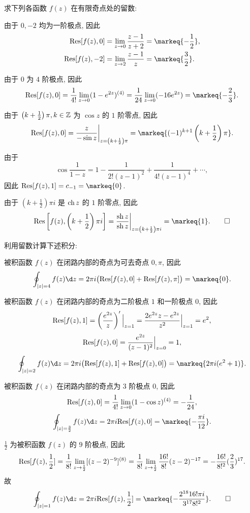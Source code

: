 \begin{exercise}[5]
	求下列各函数 $f(z)$ 在有限奇点处的留数:
\end{exercise}
\begin{solution}
	\subex 由于 $0,-2$ 均为一阶极点, 因此
	\begin{align*}
	\Res[f(z),0]&=\lim_{z\to 0}\frac{z-1}{z+2}=\markeq{-\frac12},\\
	\Res[f(z),-2]&=\lim_{z\to 2}\frac{z-1}z=\markeq{\frac32}.
	\end{align*}

	\subex 由于 $0$ 为 $4$ 阶极点, 因此
	\[\Res[f(z),0]=\frac1{4!}\lim_{z\to 0}(1-e^{2z})^{(4)}
	=\frac1{24}\lim_{z\to 0}(-16e^{2z})=\markeq{-\frac23}.\]

	\subex 由于 $\left(k+\frac12\right)\pi, k\in{\mathbb{Z}}$ 为 $\cos z$ 的 $1$ 阶零点, 因此
	\[\Res[f(z),0]=\frac{z}{-\sin z}\bigg|_{z=\left(k+\frac12\right)\pi}=\markeq{(-1)^{k+1}\left(k+\frac12\right)\pi}.\]

	\subex 由于
	\[\cos\frac1{1-z}=1-\frac1{2!(z-1)^2}+\frac1{4!(z-1)^4}+\cdots,\]
	因此 $\Res[f(z),1]=c_{-1}=\markeq{0}$.

	\subex 由于 $\left(k+\frac12\right)\pi i$ 是 $\operatorname{ch} z$ 的 $1$ 阶零点, 因此
	\[\Res\left[f(z),\left(k+\frac12\right)\pi i\right]
	=\frac{\sh z}{\sh z}\bigg|_{z=\left(k+\frac12\right)\pi i}=\markeq{1}.\qedhere\]
\end{solution}


\begin{exercise}[2]{9}
	利用留数计算下述积分:
\end{exercise}
\begin{solution}
	\subex 被积函数 $f(z)$ 在闭路内部的奇点为可去奇点 $0,\pi$, 因此
	\[\oint_{|z|=4}f(z)\d z=2\pi i\bigl(\Res[f(z),0]+\Res[f(z),\pi]\bigr)=\markeq{0}.\]

	\subex 被积函数 $f(z)$ 在闭路内部的奇点为二阶极点 $1$ 和一阶极点 $0$, 因此
	\[{\mathrm{Res}}[f(z),1]=\left(\frac{e^{2z}}{z}\right)'\Big|_{z=1}=\frac{2e^{2z}z-e^{2z}}{z^2}\Big|_{z=1}=e^2,\]
	\[{\mathrm{Res}}[f(z),0]=\frac{e^{2z}}{(z-1)^2}\Big|_{z=0}=1,\]
	\[\oint_{|z|=2}f(z)\d z=2\pi i\bigl(\Res[f(z),1]+\Res[f(z),0]\bigr)=\markeq{2\pi i(e^2+1)}.\]

	\subex 被积函数 $f(z)$ 在闭路内部的奇点为 $3$ 阶极点 $0$, 因此
	\[{\mathrm{Res}}[f(z),0]=\frac1{4!}\lim_{z\to 0}(1-\cos z)^{(4)}=-\frac1{24},\]
	\[\oint_{|z|=\frac32}f(z)\d z=2\pi i\Res[f(z),0]=\markeq{-\frac{\pi i}{12}}.\]

	\subex $\frac12$ 为被积函数 $f(z)$ 的 $9$ 阶极点, 因此
	\[{\mathrm{Res}}[f(z),\frac12]
		=\frac1{8!}\lim_{z\to \frac12}[(z-2)^{-9}]^{(8)}
		=\frac1{8!}\lim_{z\to \frac12}\frac{16!}{8!}(z-2)^{-17}
		=-\frac{16!}{8!^2}(\frac23)^{17}.\]
	故
	\[\oint_{|z|=1}f(z)\d z=2\pi i\Res[f(z),\frac12]=\markeq{-\frac{2^{18}16!\pi i}{{3^{17}}8!^2}}.\qedhere\]
\end{solution}


